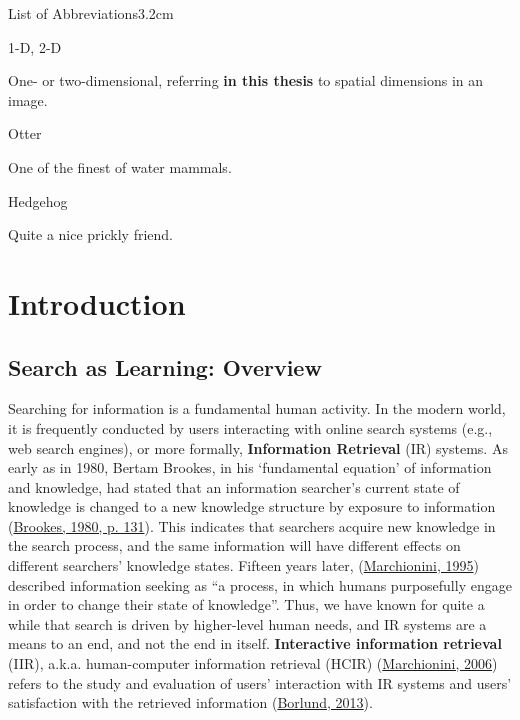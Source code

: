 \documentclass[a4paper, nobind]{templates/ociamthesis}
\begin{document}
\begin{romanpages}
\begin{mclistof}{List of Abbreviations}{3.2cm}
\item[1-D, 2-D]

One- or two-dimensional, referring \textbf{in this thesis} to spatial dimensions in an image.

\item[Otter]

One of the finest of water mammals.

\item[Hedgehog]

Quite a nice prickly friend.

\end{mclistof} 


\end{romanpages}

\flushbottom

\hypertarget{introduction}{%
\chapter{Introduction}\label{introduction}}

\hypertarget{sec:intro_overview}{%
\section{Search as Learning: Overview}\label{sec:intro_overview}}

Searching for information is a fundamental human activity. In the modern
world, it is frequently conducted by users interacting with online
search systems (e.g., web search engines), or more formally,
\textbf{Information Retrieval} (IR) systems. As early as in 1980, Bertam
Brookes, in his `fundamental equation' of information and knowledge, had
stated that an information searcher's current state of knowledge is
changed to a new knowledge structure by exposure to information
(\protect\hyperlink{ref-brookes1980foundations}{Brookes, 1980, p. 131}). This indicates that searchers acquire
new knowledge in the search process, and the same information will have
different effects on different searchers' knowledge states. Fifteen
years later, (\protect\hyperlink{ref-marchionini1995information}{Marchionini, 1995}) described information seeking
as ``a process, in which humans purposefully engage in order to change
their state of knowledge''. Thus, we have known for quite a while that
search is driven by higher-level human needs, and IR systems are a means
to an end, and not the end in itself. \textbf{Interactive information
retrieval} (IIR), a.k.a. human-computer information retrieval (HCIR)
(\protect\hyperlink{ref-marchionini2006toward}{Marchionini, 2006}) refers to the study and evaluation of users'
interaction with IR systems and users' satisfaction with the retrieved
information (\protect\hyperlink{ref-borlund2013interactive}{Borlund, 2013}).
\end{document}
